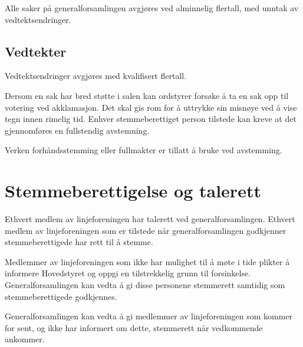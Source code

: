 Alle saker på generalforsamlingen avgjøres ved alminnelig flertall, med unntak av vedtektsendringer. 

\subsection{Vedtekter}
\vspace{23pt}

Vedtektsendringer avgjøres med kvalifisert flertall. 


Dersom en sak har bred støtte i salen kan ordstyrer forsøke å ta en sak opp til votering ved akklamasjon. Det skal gis rom for å uttrykke sin misnøye ved å vise tegn innen rimelig tid. Enhver stemmeberettiget person tilstede kan kreve at det gjennomføres en fullstendig avstemning.

Verken forhåndsstemming eller fullmakter er tillatt å bruke ved avstemming.


\section{Stemmeberettigelse og talerett}
\vspace{23pt}
Ethvert medlem av linjeforeningen har talerett ved generalforsamlingen.
Ethvert medlem av linjeforeningen som er tilstede når generalforsamlingen godkjenner stemmeberettigede har rett til å stemme.\newline
					
Medlemmer av linjeforeningen som ikke har mulighet til å møte i tide plikter å informere Hovedstyret og oppgi en tilstrekkelig grunn til forsinkelse. Generalforsamlingen kan vedta å gi disse personene stemmerett samtidig som stemmeberettigede godkjennes.

Generalforsamlingen kan vedta å gi medlemmer av linjeforeningen som kommer for sent, og ikke har informert om dette, stemmerett når vedkommende ankommer.


